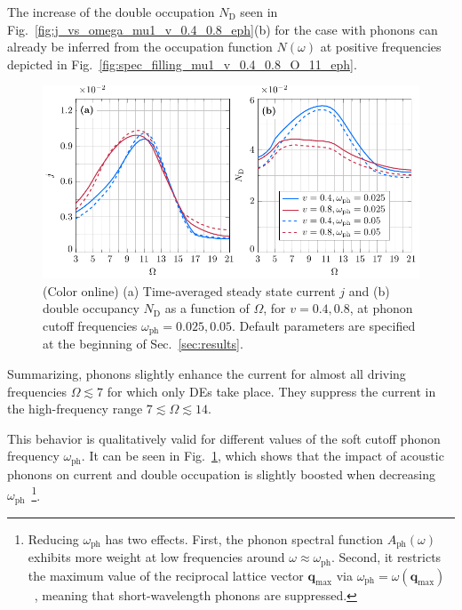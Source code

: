 \documentclass[aps,prb,groupedaddress,showpacs,twocolumn,superscriptaddress,10pt]{revtex4-2}
\renewcommand{\vec}[1]{\bm{#1}} %
\begin{document}
The increase of the double occupation $N_{\text{D}}$ seen in Fig.~\ref{fig:j_vs_omega_mu1_v_0.4_0.8_eph}(b) for the case with phonons can already be inferred from the occupation function $N(\omega)$ at positive frequencies depicted in Fig.~\ref{fig:spec_filling_mu1_v_0.4_0.8_O_11_eph}.

\begin{figure}[t] 
\includegraphics[width=\linewidth]{Fig7.pdf}
\caption{(Color online) (a) Time-averaged steady state current $j$ and (b) double occupancy $N_{\text{D}}$ as a function of $\Omega$, for $v=0.4, 0.8$, at phonon cutoff frequencies $\omega_{\text{ph}}=0.025, 0.05$. Default parameters are specified at the beginning of Sec.~\ref{sec:results}.} 
\label{fig:j_vs_omega_mu1_v_0.4_0.8_E0_2_sweep_omegaph}
\end{figure}

Summarizing, phonons slightly enhance the current for almost all driving frequencies $\Omega\lesssim 7$ for which only DEs take place. They suppress the current in the high-frequency range $7\lesssim\Omega\lesssim14$.

This behavior is qualitatively valid for different values of the soft cutoff phonon frequency $\omega_{\text{ph}}$. It can be seen in Fig.~\ref{fig:j_vs_omega_mu1_v_0.4_0.8_E0_2_sweep_omegaph}, which shows that the impact of acoustic phonons on current and double occupation is slightly boosted when decreasing $\omega_{\text{ph}}$~\footnote{Reducing $\omega_{\text{ph}}$ has two effects. First, the phonon spectral function $A_{\text{ph}}(\omega)$ exhibits more weight at low frequencies around $\omega\approx\omega_{\text{ph}}$. Second, it restricts the maximum value of the reciprocal lattice vector $\vec{q}_{\text{max}}$ via $\omega_{\text{ph}}=\omega(\vec{q}_{\text{max}})$~\cite{ma.ga.22}, meaning that short-wavelength phonons are suppressed.}. 
    
\end{document}
